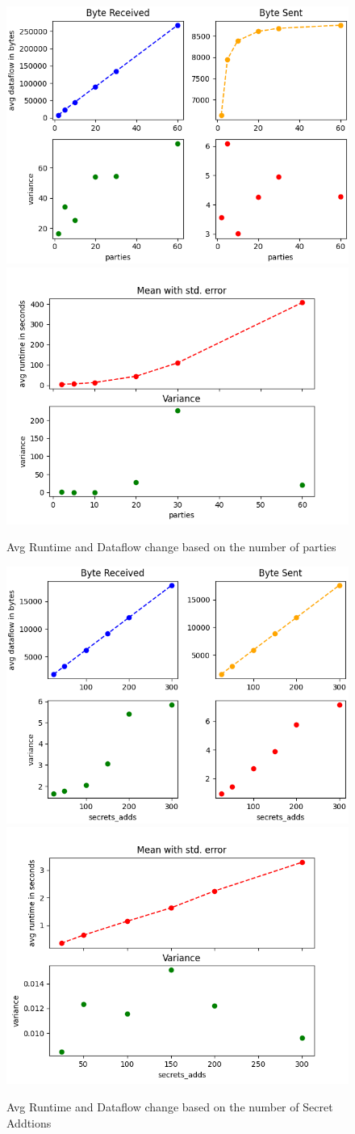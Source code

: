 \documentclass[10pt,conference,compsocconf]{IEEEtran}
\begin{document}
\begin{figure}[h!]
    \includegraphics[width=0.49\linewidth]{../performance_analysis/dataflow_num_party_change.png}
    \includegraphics[width=0.49\linewidth]{../performance_analysis/runtime_num_party_change.png}
    \caption{Avg Runtime and Dataflow change based on the number of parties}
    \label{fig:num_parties}
\end{figure}


\begin{figure}[h!]
    \centering
    \includegraphics[width=0.49\linewidth]{../performance_analysis/dataflow_secrets_additions.png}
    \includegraphics[width=0.49\linewidth]{../performance_analysis/runtime_secrets_additions.png}
    \caption{Avg Runtime and Dataflow change based on the number of Secret Addtions}
    \label{fig:num_additions}
\end{figure}
\end{document}
